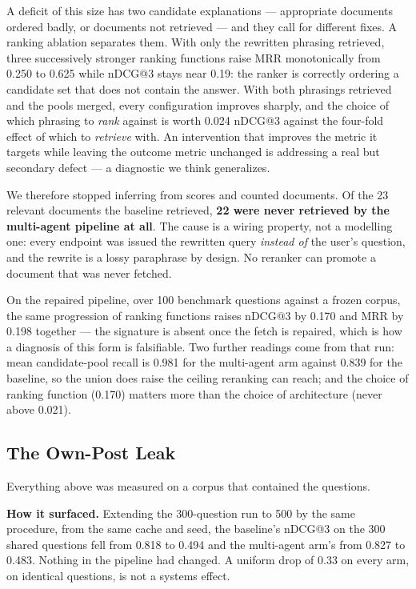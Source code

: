 \documentclass[10pt,conference]{IEEEtran}
\begin{document}
A deficit of this size has two candidate explanations --- appropriate documents
ordered badly, or documents not retrieved --- and they call for different fixes.
A ranking ablation separates them. With only
the rewritten phrasing retrieved, three successively stronger ranking functions
raise MRR monotonically from 0.250 to 0.625 while nDCG@3 stays near 0.19: the
ranker is correctly ordering a candidate set that does not contain the answer.
With both phrasings retrieved and the pools merged, every configuration improves
sharply, and the choice of which phrasing to \emph{rank} against is worth 0.024
nDCG@3 against the four-fold effect of which to \emph{retrieve} with. An
intervention that improves the metric it targets while leaving the outcome
metric unchanged is addressing a real but secondary defect --- a diagnostic we
think generalizes.

We therefore stopped inferring from scores and counted documents. Of the 23
relevant documents the baseline retrieved, \textbf{22 were never retrieved by
the multi-agent pipeline at all}. The cause is a wiring property, not a
modelling one: every endpoint was issued the rewritten query \emph{instead of}
the user's question, and the rewrite is a lossy paraphrase by design. No
reranker can promote a document that was never fetched.

On the repaired pipeline, over 100 benchmark questions against a frozen corpus,
the same progression of ranking functions raises nDCG@3 by 0.170 and MRR by
0.198 together --- the signature is absent once the fetch is repaired, which is
how a diagnosis of this form is falsifiable. Two further readings come from that
run: mean candidate-pool recall is 0.981 for the multi-agent arm against 0.839
for the baseline, so the union does raise the ceiling reranking can reach; and
the choice of ranking function (0.170) matters more than the choice of
architecture (never above 0.021).

\subsection{The Own-Post Leak}\label{sec:leak}

Everything above was measured on a corpus that contained the questions.

\textbf{How it surfaced.} Extending the 300-question run to 500 by the same
procedure, from the same cache and seed, the baseline's nDCG@3 on the 300 shared
questions fell from 0.818 to 0.494 and the multi-agent arm's from 0.827 to
0.483. Nothing in the pipeline had changed. A uniform drop of 0.33 on every arm,
on identical questions, is not a systems effect.
\end{document}

